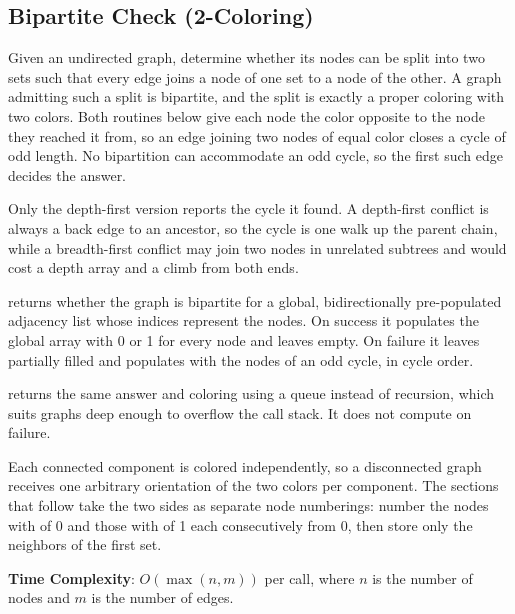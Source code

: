\subsection{Bipartite Check (2-Coloring)}
\label{sec:4.6.1}
Given an undirected graph, determine whether its nodes can be split into two sets such that every edge joins a node of one set to a node of the other. A graph admitting such a split is bipartite, and the split is exactly a proper coloring with two colors. Both routines below give each node the color opposite to the node they reached it from, so an edge joining two nodes of equal color closes a cycle of odd length. No bipartition can accommodate an odd cycle, so the first such edge decides the answer.

Only the depth-first version reports the cycle it found. A depth-first conflict is always a back edge to an ancestor, so the cycle is one walk up the parent chain, while a breadth-first conflict may join two nodes in unrelated subtrees and would cost a depth array and a climb from both ends.

\begin{compactitem}
  \item {} returns whether the graph is bipartite for a global, bidirectionally pre-populated adjacency list  whose indices represent the nodes. On success it populates the global array  with 0 or 1 for every node and leaves  empty. On failure it leaves  partially filled and populates  with the nodes of an odd cycle, in cycle order.
  \item {} returns the same answer and coloring using a queue instead of recursion, which suits graphs deep enough to overflow the call stack. It does not compute  on failure.
\end{compactitem}

Each connected component is colored independently, so a disconnected graph receives one arbitrary orientation of the two colors per component. The sections that follow take the two sides as separate node numberings: number the nodes with  of 0 and those with  of 1 each consecutively from 0, then store only the neighbors of the first set.

\textbf{Time Complexity}: $O(\max\left(n, m\right))$ per call, where $n$ is the number of nodes and $m$ is the number of edges.

